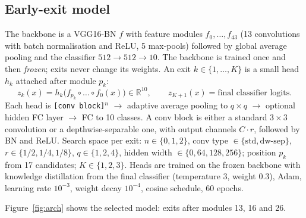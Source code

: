 \documentclass[10pt,a4paper]{article}
\begin{document}
\subsection{Early-exit model}

The backbone is a VGG16-BN $f$ with feature modules $f_0,\dots,f_{43}$ (13 convolutions with batch
normalisation and ReLU, 5 max-pools) followed by global average pooling and the classifier
$512\!\to\!512\!\to\!10$. The backbone is trained once and then \emph{frozen}; exits never change its
weights. An exit $k\in\{1,\dots,K\}$ is a small head $h_k$ attached after module $p_k$:
\[
  z_k(x) = h_k\big(f_{p_k}\circ\dots\circ f_0(x)\big)\in\mathbb{R}^{10},\qquad
  z_{K+1}(x) = \text{final classifier logits}.
\]
Each head is \texttt{[conv block]}$^{n}$ $\to$ adaptive average pooling to $q\times q$ $\to$ optional
hidden FC layer $\to$ FC to 10 classes. A conv block is either a standard $3\times3$ convolution or a
depthwise-separable one, with output channels $C\cdot r$, followed by BN and ReLU.
Search space per exit: $n\in\{0,1,2\}$, conv type $\in\{\text{std},\text{dw-sep}\}$,
$r\in\{1/2,1/4,1/8\}$, $q\in\{1,2,4\}$, hidden width $\in\{0,64,128,256\}$; position $p_k$ from 17
candidates; $K\in\{1,2,3\}$. Heads are trained on the frozen backbone with knowledge distillation from the
final classifier (temperature 3, weight 0.3), Adam, learning rate $10^{-3}$, weight decay $10^{-4}$,
cosine schedule, 60 epochs.

Figure~\ref{fig:arch} shows the selected model: exits after modules 13, 16 and 26.
\end{document}
